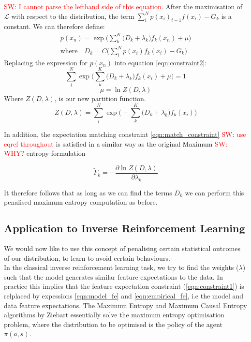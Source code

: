 \documentclass[letterpaper]{article}
\newcommand{\sw}[1]{\textcolor{red}{SW: #1}}
\begin{document}
\sw{I cannot parse the lefthand side of this equation.}
After the maximisation of $\mathcal{L}$ with respect to the distribution, the term $\sum_i^N p(x_i)_{t-1}f(x_i) - G_k$ is a constant.
We can therefore define:
\begin{equation}
	\begin{split}
	p(x_n) =\exp \Big( \sum_k^K\big(D_k+\lambda_k\big)f_k(x_n) + \mu \Big)\\
	\text{where} \quad D_k = C\big(\sum_i^N p(x_i)f_k(x_i) - G_k\big)
	\end{split}
\end{equation}
Replacing the expression for $p(x_n)$ into equation \ref{eqn:constraint2}:
\begin{equation}
	\sum_i^N \exp \Big( \sum_k^K\big(D_k+\lambda_k\big)f_k(x_i) + \mu \Big) = 1
\end{equation}
\begin{equation}
	\mu = \ln Z(D,\lambda)
\end{equation}
Where $Z(D,\lambda)$, is our new partition function.
\begin{equation}
	Z(D,\lambda) = \sum_i^N \exp \Big( -\sum_k^K\big(D_k+\lambda_k\big)f_k(x_i) \Big) 
\end{equation}

In addition, the expectation matching constraint \ref{eqn:match_constraint} \sw{use eqref throughout} is satisfied in a similar way as the original 
Maximum \sw{WHY?} entropy formulation

\begin{equation}
	\widetilde{F}_k = -\frac{\partial\ln Z(D,\lambda)}{\partial\lambda_k}
\end{equation}

It therefore follows that as long as we can find the terms $D_k$ we can perform 
this penalised maximum entropy computation as before.

\subsection{Application to Inverse Reinforcement Learning}
We would now like to use this concept of penalising certain 
statistical outcomes of our distribution, to learn to avoid certain behaviours.\\ 
In the classical inverse reinforcement learning task, we try to find the
weights ($\lambda$) such that the model generates similar feature expectations to the 
data. In practice this implies that the feature expectation constraint (\ref{eqn:constraint1}) is relplaced by expessions
\ref{eqn:model_fe} and \ref{eqn:empirical_fe}, i.e the model and data feature expectations. The Maximum Entropy and Maximum Causal Entropy algorithms by Ziebart
essentially solve the maximum entropy optimisation problem, where the distribution to be optimised
is the policy of the agent $\pi(a,s)$.
\end{document}
